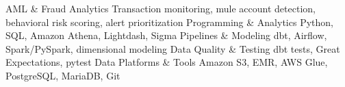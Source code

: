 
\begin{cvskills}
  \cvskill
    {AML \& Fraud Analytics}
    {Transaction monitoring, mule account detection, behavioral risk scoring, alert prioritization}
  \cvskill
    {Programming \& Analytics}
    {Python, SQL, Amazon Athena, Lightdash, Sigma}
  \cvskill
    {Pipelines \& Modeling}
    {dbt, Airflow, Spark/PySpark, dimensional modeling}
  \cvskill
    {Data Quality \& Testing}
    {dbt tests, Great Expectations, pytest}
  \cvskill
    {Data Platforms \& Tools}
    {Amazon S3, EMR, AWS Glue, PostgreSQL, MariaDB, Git}
\end{cvskills}
